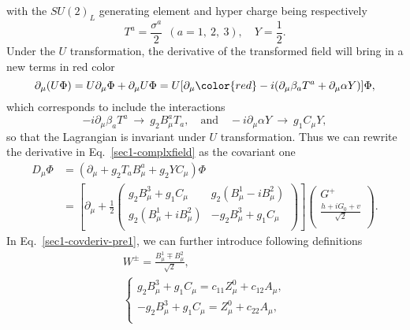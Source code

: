 \documentclass[11pt,a4paper,APS]{revtex4}
\begin{document}
		with the $SU(2)_L$ generating element and hyper charge being respectively
		\[
			T^a = \frac{\sigma^a}{2}~~(a=1,~2,~3), \quad Y = \frac{1}{2}.
		\]
		Under the $U$ transformation, the derivative of the transformed field will bring in a 
		new terms in red color 
		\begin{equation}
			\partial_\mu(U\Phi) = U\partial_\mu \Phi + \partial_\mu U \Phi 
			=U[\partial_\mu 
			{\color{red}-i(\partial_\mu\beta_a T^a + \partial_\mu \alpha Y )]\Phi},
		\end{equation}
		which  corresponds to include the interactions 
		\begin{equation}
			-i\partial_\mu \beta_a T^a ~\rightarrow~ g_2 B_\mu^a T_a ,\quad\text{and}
			\quad 
			-i \partial_\mu \alpha Y ~\rightarrow~ g_1 C_\mu Y,
		\end{equation}
		so that the Lagrangian is invariant under $U$ transformation. 
		Thus we can rewrite the derivative in Eq.~\eqref{sec1-complxfield} as the covariant one
		\begin{align}\nonumber 
			D_\mu \Phi&= (\partial_\mu + g_2 T_a B^a_\mu + g_2 YC_\mu) \Phi \\
			\label{sec1-covderiv-pre1}
			& =\left[\partial_\mu + \frac{1}{2}\left(\begin{array}{cc}
			g_2 B_\mu^3 + g_1 C_\mu    &    g_2(B_\mu^1 - i B_\mu^2)\\
			g_2(B_\mu^1 + i B_\mu^2)   &    -g_2B_\mu^3 + g_1 C_\mu \\
			\end{array}\right)\right]\left(\begin{array}{c}
			G^+ \\
			\frac{h+iG_0 + v}{\sqrt{2}} \\ 
			\end{array}\right).
		\end{align}
		In Eq.~\eqref{sec1-covderiv-pre1}, we can further introduce following definitions
		\begin{equation}\label{sec1-defin}
		\begin{gathered}
			W^\pm = \frac{B_\mu^1 \mp B_\mu^2}{\sqrt{2}}, \\
			\left\{\begin{array}{r}
			 	 g_2 B_\mu^3 + g_1 C_\mu = c_{11} Z_\mu^0 + c_{12} A_\mu, \\
			    -g_2 B_\mu^3 + g_1 C_\mu = Z_\mu^0 + c_{22} A_\mu,\\ 
			    \end{array}\right.
		\end{gathered}
		\end{equation}
\end{document}
